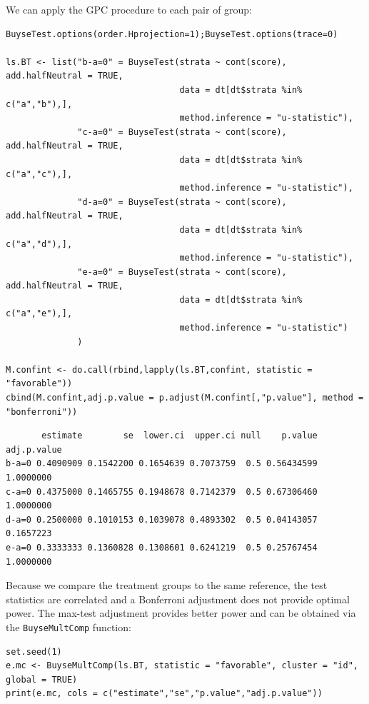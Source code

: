\documentclass[12pt]{article}
\begin{document}
We can apply the GPC procedure to each pair of group:
\lstset{language=r,label= ,caption= ,captionpos=b,numbers=none}
\begin{lstlisting}
BuyseTest.options(order.Hprojection=1);BuyseTest.options(trace=0)

ls.BT <- list("b-a=0" = BuyseTest(strata ~ cont(score), add.halfNeutral = TRUE,
                                  data = dt[dt$strata %in% c("a","b"),],
                                  method.inference = "u-statistic"),
              "c-a=0" = BuyseTest(strata ~ cont(score), add.halfNeutral = TRUE,
                                  data = dt[dt$strata %in% c("a","c"),],
                                  method.inference = "u-statistic"),
              "d-a=0" = BuyseTest(strata ~ cont(score), add.halfNeutral = TRUE,
                                  data = dt[dt$strata %in% c("a","d"),],
                                  method.inference = "u-statistic"),
              "e-a=0" = BuyseTest(strata ~ cont(score), add.halfNeutral = TRUE,
                                  data = dt[dt$strata %in% c("a","e"),],
                                  method.inference = "u-statistic")
              )

M.confint <- do.call(rbind,lapply(ls.BT,confint, statistic = "favorable"))
cbind(M.confint,adj.p.value = p.adjust(M.confint[,"p.value"], method = "bonferroni"))
\end{lstlisting}

\begin{verbatim}
       estimate        se  lower.ci  upper.ci null    p.value adj.p.value
b-a=0 0.4090909 0.1542200 0.1654639 0.7073759  0.5 0.56434599   1.0000000
c-a=0 0.4375000 0.1465755 0.1948678 0.7142379  0.5 0.67306460   1.0000000
d-a=0 0.2500000 0.1010153 0.1039078 0.4893302  0.5 0.04143057   0.1657223
e-a=0 0.3333333 0.1360828 0.1308601 0.6241219  0.5 0.25767454   1.0000000
\end{verbatim}



Because we compare the treatment groups to the same reference, the
test statistics are correlated and a Bonferroni adjustment does not
provide optimal power. The max-test adjustment provides better power
and can be obtained via the \texttt{BuyseMultComp} function:
\lstset{language=r,label= ,caption= ,captionpos=b,numbers=none}
\begin{lstlisting}
set.seed(1)
e.mc <- BuyseMultComp(ls.BT, statistic = "favorable", cluster = "id", global = TRUE)
print(e.mc, cols = c("estimate","se","p.value","adj.p.value"))
\end{lstlisting}
\end{document}
